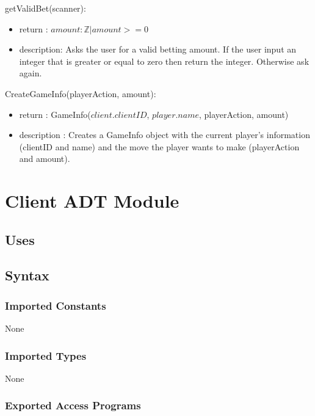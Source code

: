\documentclass[12pt, titlepage]{article}
\begin{document}
        \noindent getValidBet(scanner):
        \begin{itemize}
        \item return : $amount : \mathbb{Z} | amount >= 0$
        \item description: Asks the user for a valid betting amount. If the user input an integer that is greater or equal to zero then return the integer. Otherwise ask again.
        \end{itemize}
        
        \noindent CreateGameInfo(playerAction, amount):
        \begin{itemize}
        \item return : GameInfo($client.clientID$, $player.name$, playerAction, amount)
        \item description : Creates a GameInfo object with the current player's information (clientID and name) and the move the player wants to make (playerAction and amount).
        \end{itemize}
        
                
        
\section* {Client ADT Module}
    \subsection* {Uses}
    \subsection* {Syntax}
    
        \subsubsection* {Imported Constants}
            None
        \subsubsection* {Imported Types}
            None
        \subsubsection* {Exported Access Programs}
        
\end{document}

